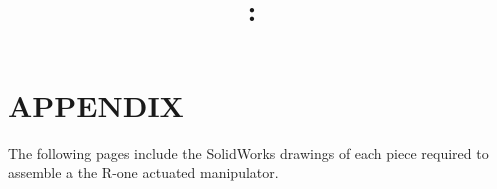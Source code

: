 \documentclass[12pt,onecolumn]{report}
\title{\textmd{\Huge{\textbf{\hmwkTitle}}}\\
\Large{\textbf{\hmwkClass:\ \textit{\hmwkClassInstructor}}}\vspace{0.75in}
}
\author{\Large{\textbf{\hmwkAuthorName}}}
\renewcommand\thesection{\arabic{section}}
\begin{document}
\maketitle
\tableofcontents
{}

\renewcommand*\thesection{\arabic{section}} 

\newpage
\onehalfspacing






\section{APPENDIX}
\label{sec:Appendix}
The following pages include the SolidWorks drawings
of each piece required to assemble a the R-one actuated manipulator.
\end{document}
